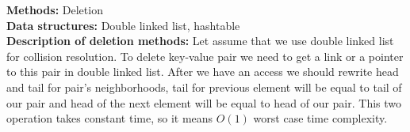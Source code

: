\documentclass[10pt]{article}
\begin{document}
\textbf{Methods:} Deletion \\
\textbf{Data structures:} Double linked list, hashtable \\
\textbf{Description of deletion methods:} 
Let assume that we use double linked list for collision resolution.
To delete key-value pair we need to get a link or a pointer to this pair in double linked list.
After we have an access we should rewrite head and tail for pair's neighborhoods, tail for previous element  will be equal to tail of our pair and head of the next element will be equal to head of our pair. This two operation takes constant time, so it means $O(1)$ worst case time complexity.\\
\end{document}
